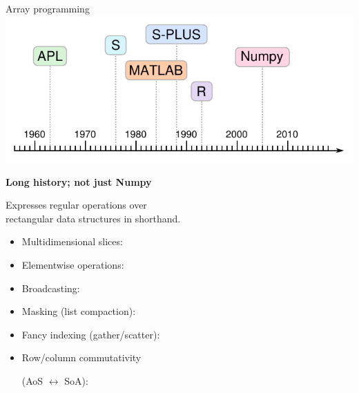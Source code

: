 \documentclass[aspectratio=169]{beamer}
\begin{document}
\begin{frame}[fragile]{Array programming}
\vspace{0.2 cm}
\hfill \includegraphics[height=3 cm]{apl-timeline.pdf}

\vspace{-2.15 cm}
{\bf\large Long history; not just Numpy}

\vspace{0.5 cm}
Expresses regular operations over \\ rectangular data structures in shorthand.

\vspace{0.5 cm}
\begin{itemize}\setlength{\itemsep}{0.15 cm}
\item<2-> Multidimensional slices: 
\item<3-> Elementwise operations: 
\item<4-> Broadcasting: 
\item<5-> Masking (list compaction): 
\item<6-> Fancy indexing (gather/scatter): 
\item<7-> Row/column commutativity 

(AoS $\leftrightarrow$ SoA): 
\end{itemize}
\end{frame}
\end{document}
